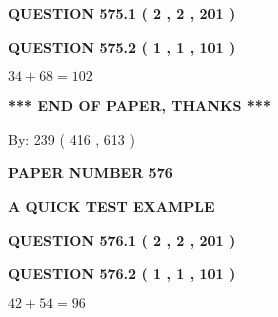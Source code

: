 \documentclass[12pt]{article}
\begin{document}
   
  
\vspace{0.2in}
  
{\textbf{\Large{QUESTION
575.1 
 ( 2 , 2 , 201 )
}}}
  
  
  
\vspace{0.2in}
  
{\textbf{\Large{QUESTION
575.2 
 ( 1 , 1 , 101 )
}}}
  
  
 
 

$ %
34 +  %
68=   %
102$
 
 
   
   
 \vspace{0.2in}
 
   
   
   
   
\vspace{1.0in} 
{\textbf{\large{ *** END OF PAPER, THANKS *** }}} 
   
   
\hspace{1.0in} By: 
 239 ( 416 ,  613 )
   
   
   
   
\newpage 
\setcounter{page}{ 
   576001 } 
   
   
   
   
 {\textbf{ \Large{ PAPER NUMBER  576  }}}
   
   
\vspace{0.2in}
   
   
   
   
   
   
 \vspace{0.2in}
{\LARGE {\textbf{ A QUICK TEST EXAMPLE}}}
   
   
  
\vspace{0.2in}
  
{\textbf{\Large{QUESTION
576.1 
 ( 2 , 2 , 201 )
}}}
  
  
  
\vspace{0.2in}
  
{\textbf{\Large{QUESTION
576.2 
 ( 1 , 1 , 101 )
}}}
  
  
 
 

$ %
42 +  %
54=   %
96$
 
 
   
\end{document}
